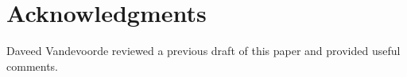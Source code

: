 \section*{Acknowledgments}

Daveed Vandevoorde reviewed a previous draft of this paper and provided useful comments.
